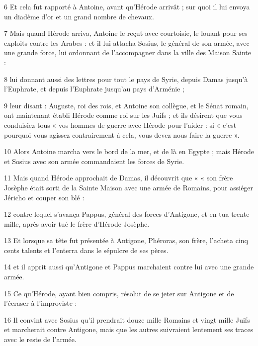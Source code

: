 \par 6 Et cela fut rapporté à Antoine, avant qu'Hérode arrivât ; sur quoi il lui envoya un diadème d'or et un grand nombre de chevaux.

\par 7 Mais quand Hérode arriva, Antoine le reçut avec courtoisie, le louant pour ses exploits contre les Arabes : et il lui attacha Sosius, le général de son armée, avec une grande force, lui ordonnant de l'accompagner dans la ville des Maison Sainte :

\par 8 lui donnant aussi des lettres pour tout le pays de Syrie, depuis Damas jusqu'à l'Euphrate, et depuis l'Euphrate jusqu'au pays d'Arménie ;

\par 9 leur disant : Auguste, roi des rois, et Antoine son collègue, et le Sénat romain, ont maintenant établi Hérode comme roi sur les Juifs ; et ils désirent que vous conduisiez tous « vos hommes de guerre avec Hérode pour l'aider : si « c'est pourquoi vous agissez contrairement à cela, vous devez nous faire la guerre ».

\par 10 Alors Antoine marcha vers le bord de la mer, et de là en Egypte ; mais Hérode et Sosius avec son armée commandaient les forces de Syrie.

\par 11 Mais quand Hérode approchait de Damas, il découvrit que « « son frère Josèphe était sorti de la Sainte Maison avec une armée de Romains, pour assiéger Jéricho et couper son blé :

\par 12 contre lequel s'avança Pappus, général des forces d'Antigone, et en tua trente mille, après avoir tué le frère d'Hérode Josèphe.

\par 13 Et lorsque sa tête fut présentée à Antigone, Phéroras, son frère, l'acheta cinq cents talents et l'enterra dans le sépulcre de ses pères.

\par 14 et il apprit aussi qu'Antigone et Pappus marchaient contre lui avec une grande armée.

\par 15 Ce qu'Hérode, ayant bien compris, résolut de se jeter sur Antigone et de l'écraser à l'improviste :

\par 16 Il convint avec Sosius qu'il prendrait douze mille Romains et vingt mille Juifs et marcherait contre Antigone, mais que les autres suivraient lentement ses traces avec le reste de l'armée.


